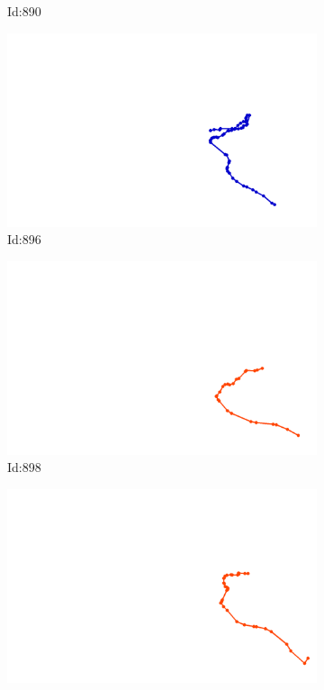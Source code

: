 \documentclass[12pt,twoside]{report}
\begin{document}
\begin{figure}
\begin{subfigure}[b]{0.20\textwidth}
\caption{Id:890}
\end{subfigure}
\begin{subfigure}[b]{0.20\textwidth}
\centering
\includegraphics[width=\textwidth]{../trajectories/896.png}
\caption{Id:896}
\end{subfigure}
\begin{subfigure}[b]{0.20\textwidth}
\centering
\includegraphics[width=\textwidth]{../trajectories/898.png}
\caption{Id:898}
\end{subfigure}
\begin{subfigure}[b]{0.20\textwidth}
\centering
\includegraphics[width=\textwidth]{../trajectories/912.png}

\end{subfigure}
\end{figure}
\end{document}
